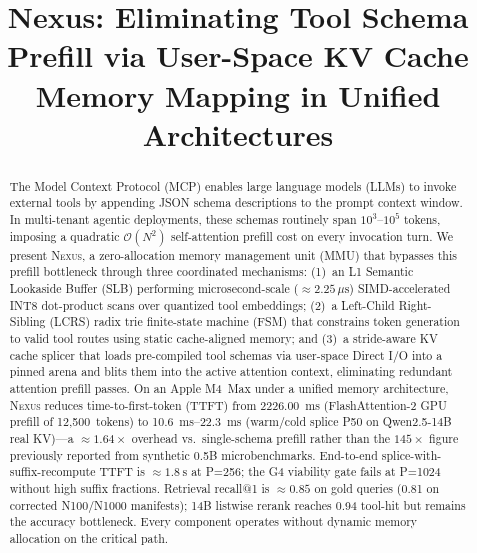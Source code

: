 \documentclass[conference,10pt]{IEEEtran}
\newcommand{\Nexus}{\textsc{Nexus}\xspace}
\begin{document}
\title{Nexus: Eliminating Tool Schema Prefill via User-Space KV Cache Memory Mapping in Unified Architectures}

\author{
}

\maketitle

\begin{abstract}
The Model Context Protocol (MCP) enables large language models (LLMs) to
invoke external tools by appending JSON schema descriptions to the prompt
context window. In multi-tenant agentic deployments, these schemas routinely
span $10^{3}$--$10^{5}$ tokens, imposing a quadratic $\mathcal{O}(N^{2})$
self-attention prefill cost on every invocation turn. We present \Nexus, a
zero-allocation memory management unit (MMU) that bypasses this
prefill bottleneck through three coordinated mechanisms: (1)~an L1 Semantic
Lookaside Buffer (SLB) performing microsecond-scale ($\approx 2.25\,\mu\text{s}$)
SIMD-accelerated INT8 dot-product scans over quantized tool embeddings;
(2)~a Left-Child Right-Sibling (LCRS) radix trie finite-state machine (FSM)
that constrains token generation to valid tool routes using static cache-aligned memory;
and (3)~a stride-aware KV cache splicer that loads pre-compiled tool schemas via
user-space Direct I/O into a pinned arena and blits them into the active attention
context, eliminating redundant attention prefill passes. On an Apple M4~Max under a unified memory
architecture, \Nexus reduces time-to-first-token (TTFT) from
\SI{2226.00}{\milli\second} (FlashAttention-2 GPU prefill of 12,500~tokens)
to \SIrange{10.6}{22.3}{\milli\second} (warm/cold splice P50 on Qwen2.5-14B real KV)---a
\(\approx\!1.64\times\) overhead vs.\ single-schema prefill rather than the
\(145\times\) figure previously reported from synthetic 0.5B microbenchmarks.
End-to-end splice-with-suffix-recompute TTFT is \(\approx\!\SI{1.8}{\second}\) at
P=256; the G4 viability gate fails at P=1024 without high suffix fractions.
Retrieval recall@1 is \(\approx\!0.85\) on gold queries (0.81 on corrected N100/N1000
manifests); 14B listwise rerank reaches 0.94 tool-hit but remains the accuracy bottleneck.
Every component operates without dynamic memory allocation on the critical path.
\end{abstract}
\end{document}
